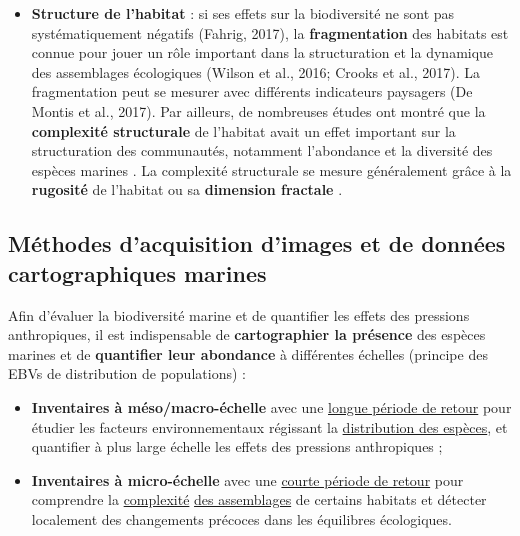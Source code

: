 \begin{itemize}
    \item \textbf{Structure de l’habitat} : si ses effets sur la biodiversité ne sont pas systématiquement négatifs (Fahrig, 2017), la \textbf{fragmentation} des habitats est connue pour jouer un rôle important dans la structuration et la dynamique des assemblages écologiques (Wilson et al., 2016; Crooks et al., 2017). La fragmentation peut se mesurer avec différents indicateurs paysagers (De Montis et al., 2017). Par ailleurs, de nombreuses études ont montré que la \textbf{complexité structurale} de l’habitat avait un effet important sur la structuration des communautés, notamment l’abondance et la diversité des espèces marines \citep{luckhurst_analysis_1978, gratwicke_relationship_2005, harborne_biotic_2011, meager_topographic_2011, kovalenko_habitat_2012, graham_importance_2013, rees_abiotic_2014, darling_relationships_2017}. La complexité structurale se mesure généralement grâce à la \textbf{rugosité} de l’habitat \citep{friedman_multi-scale_2012, dustan_digital_2013, leon_measuring_2015} ou sa \textbf{dimension fractale} \citep{yanovski_structural_2017, young_cost_2017, fukunaga_integrating_2019}. 
    
\end{itemize}

\setlength{\fboxsep}{3pt}
\setlength{\fboxrule}{0.6pt}
\noindent{}

\subsection{Méthodes d’acquisition d’images et de données cartographiques marines}\label{intro.2.2}

Afin d’évaluer la biodiversité marine et de quantifier les effets des pressions anthropiques, il est indispensable de \textbf{cartographier la présence} des espèces marines et de \textbf{quantifier leur abondance} à différentes échelles (principe des EBVs de distribution de populations) :

\begin{itemize}
    \item \textbf{Inventaires à méso/macro-échelle} avec une \underline{longue période de retour} pour étudier les facteurs environnementaux régissant la \underline{distribution des espèces}, et quantifier à plus large échelle les effets des pressions anthropiques ;
    
    \item \textbf{Inventaires à micro-échelle} avec une \underline{courte période de retour} pour comprendre la \underline{complexité} \underline{des assemblages} de certains habitats et détecter localement des changements précoces dans les équilibres écologiques.
\end{itemize}

